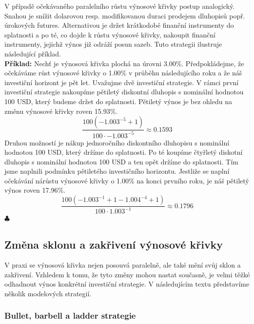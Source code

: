 \documentclass[a4paper]{book}
\begin{document}
V případě očekávaného paralelního růstu výnosové křivky postup analogický. Snahou je snížit dolarovou resp. modifikovanou duraci prodejem dluhopisů popř. úrokových futures. Alternativou je držet krátkodobé finanční instrumenty do splatnosti a po té, co dojde k růstu výnosové křivky, nakoupit finanční instrumenty, jejichž výnos již odráží posun sazeb. Tuto strategii ilustruje následující příklad.\\

\noindent \textbf{Příklad:} Nechť je výnosová křivka plochá na úrovni 3.00\%. Předpokládejme, že očekáváme růst výnosové křivky o 1.00\% v průběhu následujícího roku a že náš investiční horizont je pět let. Uvažujme dvě investiční strategie. V rámci první investiční strategie nakoupíme pětiletý diskontní dluhopis s nominální hodnotou 100 USD, který budeme držet do splatnosti. Pětiletý výnos je bez ohledu na změnu výnosové křivky roven 15.93\%.
\begin{equation*}
\frac{100(-1.003^{-5} + 1)}{100 \cdot -1.003^{-5}} \approx 0.1593
\end{equation*}
Druhou možností je nákup jednoročního diskontního dluhopisu s nominální hodnotou 100 USD, který držíme do splatnosti. Po té koupíme čtyřletý diskotní dluhopis s nominální hodnotou 100 USD a ten opět držíme do splatnosti. Tím jsme naplnili podmínku pětiletého investičního horizontu. Jestliže se naplní očekávání nárůstu výnosové křivky o 1.00\% na konci prvního roku, je náš pětiletý výnos roven 17.96\%.
\begin{equation*}
\frac{100( -1.003^{-1} + 1 - 1.004^{-4} + 1)}{100 \cdot 1.003^{-1}} \approx 0.1796
\end{equation*}
$\clubsuit$\\

\subsection{Změna sklonu a zakřivení výnosové křivky}

V praxi se výnosová křivka nejen posouvá paralelně, ale také mění svůj sklon a zakřivení. Vzhledem k tomu, že tyto změny mohou nastat současně, je velmi těžké odhadnout výnos konkrétní investiční strategie. V následujícím textu představíme několik modelových strategií.

\subsubsection{Bullet, barbell a ladder strategie}
\end{document}
